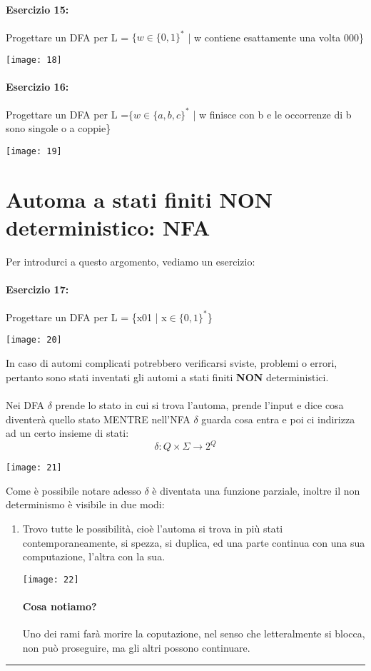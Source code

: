 \documentclass[12pt, a4paper, openany, oneside]{book}
\begin{document}
\paragraph{Esercizio 15: }
Progettare un DFA per L = $\{w \in \{0,1\}^{*}$ | w contiene esattamente una volta
000\}
\begin{center}
\texttt{[image: 18]}
\end{center}
\paragraph{Esercizio 16: }
Progettare un DFA per L =$ \{w \in \{a,b,c\}^{*}$ | w finisce con b e le occorrenze
di b sono singole o a coppie\}
\begin{center}
\texttt{[image: 19]}
\end{center}
\section{Automa a stati finiti NON deterministico: NFA}
Per introdurci a questo argomento, vediamo un esercizio:
\paragraph{Esercizio 17: }
Progettare un DFA per L = \{x01 | x$\in\{0,1\}^{*}$\}
\begin{center}
\texttt{[image: 20]}
\end{center}
In caso di automi complicati potrebbero verificarsi sviste, problemi o errori, 
pertanto sono stati inventati gli automi a stati finiti \textbf{NON} deterministici.
\\ \\
Nei DFA $\delta$ prende lo stato in cui si trova l'automa, prende l'input e dice
cosa diventerà quello stato MENTRE nell'NFA $\delta$ guarda cosa entra e poi 
ci indirizza ad un certo insieme di stati:
\[
\delta : Q \times \Sigma \to 2^{Q}
\]
\begin{center}
\texttt{[image: 21]}
\end{center}
Come è possibile notare adesso $\delta$ è diventata una funzione parziale, inoltre
il non determinismo è visibile in due modi:
\begin{enumerate}
	\item Trovo tutte le possibilità, cioè l'automa si trova in più stati 
	contemporaneamente, si spezza, si duplica, ed una parte continua con una
	sua computazione, l'altra con la sua. 
	\begin{center}
	\texttt{[image: 22]}
	\end{center}
	\paragraph{Cosa notiamo? }Uno dei rami farà morire la coputazione, nel senso
	che letteralmente si blocca, non può proseguire, ma gli altri possono continuare.
\end{enumerate}
{\color{black} \rule{\linewidth}{0.3mm}}
\end{document}
